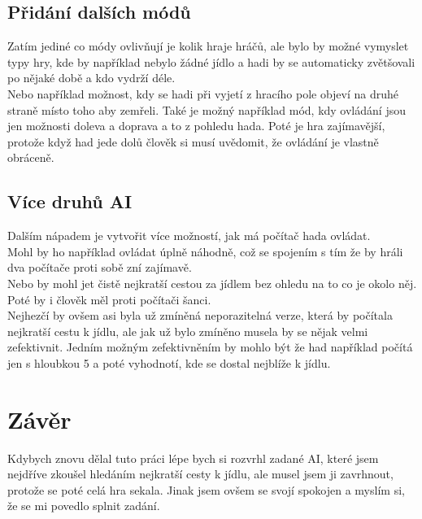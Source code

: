 \documentclass[a4paper,12pt]{report}
\begin{document}
\section{Přidání dalších módů}
Zatím jediné co módy ovlivňují je kolik hraje hráčů, ale bylo by možné vymyslet typy hry, kde by například nebylo žádné jídlo a hadi by se automaticky zvětšovali po nějaké době a kdo vydrží déle.\\
Nebo například možnost, kdy se hadi při vyjetí z hracího pole objeví na druhé straně místo toho aby zemřeli. Také je možný například mód, kdy ovládání jsou jen možnosti doleva a doprava a to z pohledu hada. Poté je hra zajímavější, protože když had jede dolů člověk si musí uvědomit, že ovládání je vlastně obráceně.\\
\section{Více druhů AI}
Dalším nápadem je vytvořit více možností, jak má počítač hada ovládat.\\
Mohl by ho například ovládat úplně náhodně, což se spojením s tím že by hráli dva počítače proti sobě zní zajímavě.\\
Nebo by mohl jet čistě nejkratší cestou za jídlem bez ohledu na to co je okolo něj. Poté by i člověk měl proti počítači šanci.\\
Nejhezčí by ovšem asi byla už zmíněná neporazitelná verze, která by počítala nejkratší cestu k jídlu, ale jak už bylo zmíněno musela by se nějak velmi zefektivnit. Jedním možným zefektivněním by mohlo být že had například počítá jen s hloubkou 5 a poté vyhodnotí, kde se dostal nejblíže k jídlu.
\chapter{Závěr}
Kdybych znovu dělal tuto práci lépe bych si rozvrhl zadané AI, které jsem nejdříve zkoušel hledáním nejkratší cesty k jídlu, ale musel jsem ji zavrhnout, protože se poté celá hra sekala. Jinak jsem ovšem se svojí spokojen a myslím si, že se mi povedlo splnit zadání.
\end{document}
